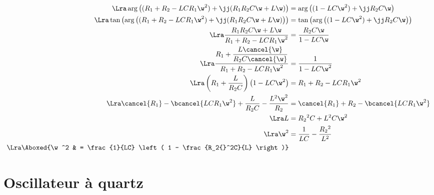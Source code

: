 \documentclass[a4paper, 12pt, final, garamond]{book}
\begin{document}
{\begin{align*}
		\Lra
		\arg \left( (R_1 + R_2 - LCR_1\w^2) + \jj(R_1R_2C\w + L\w) \right)
		 & = \arg \left( (1-LC\w^2) + \jj R_2C\w \right)                  \\
		\Lra
		\tan \left(\arg \left( (R_1 + R_2 - LCR_1\w^2) + \jj(R_1R_2C\w + L\w) \right)\right)
		 & = \tan\left(\arg \left( (1-LC\w^2) + \jj R_2C\w \right)\right) \\
		\Lra
		\frac{R_1R_2C\w + L\w}{R_1 + R_2 - LCR_1\w^2}
		 & = \frac{R_2C\w}{1-LC\w}                                        \\
		\Lra
		\frac{R_1 + \dfrac{L\cancel{\w}}{R_2C\cancel{\w}}}{R_1 + R_2 - LCR_1\w^2}
		 & = \frac{1}{1-LC\w^2}                                           \\
		\Lra
		\left( R_1 + \frac{L}{R_2C} \right) \left( 1-LC\w^2 \right)
		 & = R_1 + R_2 - LCR_1\w^2                                        \\
		\Lra
		\cancel{R_1} - \bcancel{LCR_1\w^2} + \frac{L}{R_2C} - \frac{L^2\w^2}{R_2}
		 & = \cancel{R_1} + R_2 - \bcancel{LCR_1\w^2}                     \\
		\Lra
		L
		 & = R_2{}^2 C + L^2C\w^2                                         \\
		\Lra
		\w^2
		 & = \frac{1}{LC} - \frac{R_2{}^2}{L^2}                           \\
		\Lra
		\Aboxed{\w^2
		 & = \frac{1}{LC} \left( 1 - \frac{R_2{}^2C}{L} \right)}
	\end{align*}
}

\resetQ
\section{Oscillateur à quartz}
\end{document}
